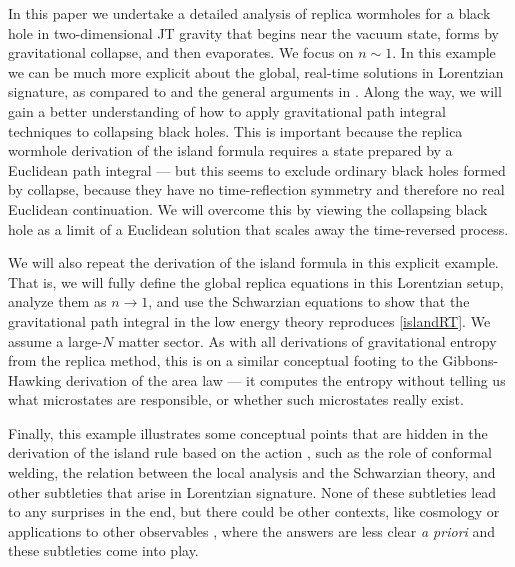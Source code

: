 \documentclass[11pt,oneside,letterpaper]{article}
\numberwithin{equation}{section}
\begin{document}
\begin{spacing}{1.1}
In this paper we undertake a detailed analysis of replica wormholes for a black hole in two-dimensional JT gravity that begins near the vacuum state, forms by gravitational collapse, and then evaporates. We focus on $n \sim 1$. In this example we can be much more explicit about the global, real-time solutions in Lorentzian signature, as compared to \cite{Lewkowycz:2013nqa,Dong:2016hjy} and the general arguments in \cite{Almheiri:2019qdq,Penington:2019kki}. Along the way, we will gain a better understanding of how to apply gravitational path integral techniques to collapsing black holes. This is important because the replica wormhole derivation of the island formula requires a state prepared by a Euclidean path integral --- but this seems to exclude ordinary black holes formed by collapse, because they have no time-reflection symmetry and therefore no real Euclidean continuation. We will overcome this by viewing the collapsing black hole as a limit of a Euclidean solution that scales away the time-reversed process.

We will also repeat the derivation of the island formula in this explicit example. That is, we will fully define the global replica equations in this Lorentzian setup, analyze them as $n \to 1$, and use the Schwarzian equations to show that the gravitational path integral in the low energy theory reproduces \eqref{islandRT}. We assume a large-$N$ matter sector. As with all derivations of gravitational entropy from the replica method, this is on a similar conceptual footing to the Gibbons-Hawking derivation of the area law ---  it computes the entropy without telling us what microstates are responsible, or whether such microstates really exist. 

Finally, this example illustrates some conceptual points that are hidden in the derivation of the island rule based on the action \cite{Almheiri:2019qdq, Penington:2019kki}, such as the role of conformal welding, the relation between the local analysis \cite{Lewkowycz:2013nqa} and the Schwarzian theory, and other subtleties that arise in Lorentzian signature. None of these subtleties lead to any surprises in the end, but there could be other contexts, like cosmology \cite{Dong:2020uxp,Krishnan:2020fer,Chen:2020tes,Hartman:2020khs,VanRaamsdonk:2020tlr,Balasubramanian:2020coy} or applications to other observables \cite{Marolf:2020xie,Engelhardt:2020qpv,Stanford:2020wkf,Akers:2020pmf,Marolf:2020rpm,Goel:2020yxl}, where the answers are less clear \textit{a priori} and these subtleties come into play. 





\end{spacing}
\end{document}
